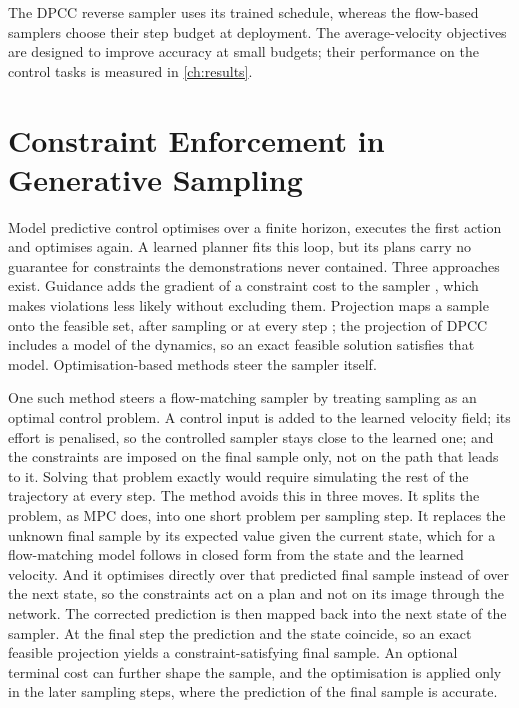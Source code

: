 \documentclass[headsepline,footsepline,footinclude=false,oneside,fontsize=11pt,paper=a4,listof=totoc,bibliography=totoc]{scrbook}
\theoremstyle{definition}
\theoremstyle{plain}
\theoremstyle{remark}
\begin{document}
The DPCC reverse sampler uses its trained schedule, whereas the flow-based samplers choose their
step budget at deployment. The average-velocity objectives are designed to improve accuracy at
small budgets; their performance on the control tasks is measured in \autoref{ch:results}.

\section{Constraint Enforcement in Generative Sampling}\label{sec:bg:mpc}

Model predictive control \parencite{morari1999model} optimises over a finite horizon, executes the
first action and optimises again. A learned planner fits this loop, but its plans carry no guarantee
for constraints the demonstrations never contained. Three approaches exist. Guidance adds the gradient
of a constraint cost to the sampler \parencite{carvalho2025motion}, which makes violations less likely
without excluding them. Projection maps a sample onto the feasible set, after sampling
\parencite{power2023sampling} or at every step \parencite{christopher2024constrained,romer2025diffusion};
the projection of \ac{DPCC} includes a model of the dynamics, so an exact feasible solution satisfies
that model. Optimisation-based methods steer the sampler itself.

One such method \parencite{li2025hardflow} steers a flow-matching sampler by treating sampling as an
optimal control problem. A control input is added to the learned velocity field; its effort is penalised, so
the controlled sampler stays close to the learned one; and the constraints are imposed on the final
sample only, not on the path that leads to it. Solving that problem exactly would require simulating
the rest of the trajectory at every step. The method avoids this in three moves. It splits the problem,
as \ac{MPC} does, into one short problem per sampling step. It replaces the unknown
final sample by its expected value given the current state, which for a flow-matching model follows in
closed form from the state and the learned velocity. And it optimises directly over that predicted
final sample instead of over the next state, so the constraints act on a plan and not on its image
through the network. The corrected prediction is then mapped back into the next state of the sampler.
At the final step the prediction and the state coincide, so an exact feasible projection yields a
constraint-satisfying final sample. An optional terminal cost can further shape the sample, and the optimisation is applied only
in the later sampling steps, where the prediction of the final sample is accurate.
\end{document}
